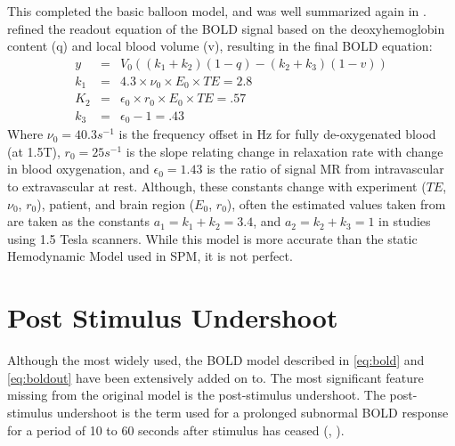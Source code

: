 This completed the basic balloon model, and was well summarized again
in \cite{Riera2003}.  \cite{Obata2004} refined the readout equation 
of the BOLD signal based on the
deoxyhemoglobin content (q) and local blood volume (v), resulting in the
final BOLD equation:
\begin{eqnarray}
y   &=& V_0((k_1 + k_2)(1-q) - (k_2 + k_3)(1-v))\\
k_1 &=& 4.3 \times \nu_0 \times E_0 \times TE = 2.8\\
K_2 &=& \epsilon_0 \times r_0 \times E_0 \times TE = .57\\
k_3 &=& \epsilon_0 - 1 = .43
\label{eq:boldout}
\end{eqnarray}
Where $\nu_0 = 40.3 s^{-1}$  is the frequency offset in Hz for fully
de-oxygenated blood (at 1.5T), $r_0 = 25 s^{-1}$  is the slope relating
change in relaxation rate with change in blood oxygenation, and
$\epsilon_0 = 1.43$ is the 
ratio of signal MR from intravascular to extravascular at rest. Although,
these constants change with experiment ($TE$, $\nu_0$, $r_0$),
patient, and brain 
region ($E_0$, $r_0$), often the estimated values taken from \cite{Obata2004} are 
taken as the constants $a_1 = k_1 + k_2 = 3.4$, and $a_2 = k_2+k_3 = 1$ in 
studies using 1.5 Tesla scanners.
While this model is more accurate than the static Hemodynamic Model used in SPM,
it is not perfect. 

\section{Post Stimulus Undershoot}
\label{sec:Post Stimulus Undershoot}
Although the most widely used, the BOLD model described in \autoref{eq:bold}
and \autoref{eq:boldout} have been extensively added on to. The most
significant feature missing from the original model is the 
post-stimulus undershoot.
The post-stimulus undershoot is the term used for a prolonged subnormal
BOLD response for a period of 10 to 60 seconds after stimulus has
ceased (\cite{Chen2009}, \cite{Mandeville1999a}).

